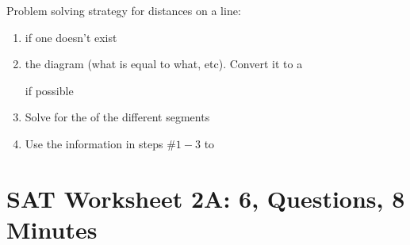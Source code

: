 \vfill
Problem solving strategy for distances on a line:

\begin{spacing}{1.5}
\begin{enumerate}[label=\Roman*)]
\item \longline if one doesn't exist
\item \longline the diagram (what is equal to what, etc). Convert it to a

\longline if possible
\item Solve for the \longline of the different segments
\item Use the information in steps \#$1-3$ to \longline
\end{enumerate}
\end{spacing}

\vfill
\newpage
\section{SAT Worksheet 2A: 6, Questions, 8 Minutes}


